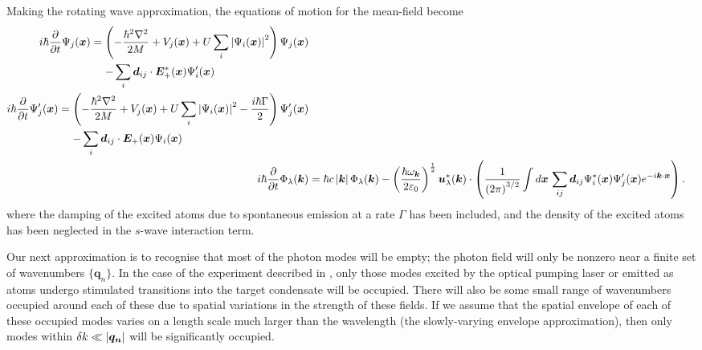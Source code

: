 Making the rotating wave approximation, the equations of motion for the mean-field become
\begin{subequations}
    \label{OpticalPumping:MeanFieldRWAEvolution}
    \begin{align}
        \begin{split}
            i \hbar \frac{\partial}{\partial t} \Psi_j(\bm{x}) &= \left( -\frac{\hbar^2 \nabla^2}{2M} + V_j(\bm{x}) + U \sum_i \abs{\Psi_i(\bm{x})}^2\right) \Psi_j(\bm{x})\\
            &\relphantom{=} - \sum_i \bm{d}_{ij} \cdot \bm{E}_+^*(\bm{x}) \Psi'_i(\bm{x})
        \end{split}\\
        \begin{split}
            i \hbar \frac{\partial}{\partial t} \Psi'_j(\bm{x}) &= \left( -\frac{\hbar^2 \nabla^2}{2M} + V_j(\bm{x}) + U \sum_i \abs{\Psi_i(\bm{x})}^2 - \frac{i\hbar \Gamma}{2}\right) \Psi'_j(\bm{x})\\
            &\relphantom{=} - \sum_i \bm{d}_{ij} \cdot \bm{E}_+(\bm{x}) \Psi_i(\bm{x}) 
        \end{split}\\
        i \hbar \frac{\partial}{\partial t} \Phi_\lambda(\bm{k}) &= \hbar c \abs{\bm{k}} \Phi_\lambda(\bm{k}) - \left(\frac{\hbar \omega_{\bm{k}}}{2 \varepsilon_0}\right)^{\frac{1}{2}} \bm{u}_\lambda^*(\bm{k}) \cdot \left( \frac{1}{\left(2\pi\right)^{3/2}} \int d \bm{x}\, \sum_{ij}\bm{d}_{ij} \Psi^*_i(\bm{x}) \Psi'_j(\bm{x}) e^{-i \bm{k} \cdot \bm{x}} \right). \label{OpticalPumping:MeanFieldPhotonRWAEvolution}
    \end{align}
\end{subequations}
where the damping of the excited atoms due to spontaneous emission at a rate $\Gamma$ has been included, and the density of the excited atoms has been neglected in the $s$-wave interaction term.

Our next approximation is to recognise that most of the photon modes will be empty; the photon field will only be nonzero near a finite set of wavenumbers $\{\bm{q}_n\}$.  In the case of the experiment described in , only those modes excited by the optical pumping laser or emitted as atoms undergo stimulated transitions into the target condensate will be occupied.  There will also be some small range of wavenumbers occupied around each of these due to spatial variations in the strength of these fields.  If we assume that the spatial envelope of each of these occupied modes varies on a length scale much larger than the wavelength (the slowly-varying envelope approximation), then only modes within $\delta k \ll \left|\bm{q_n}\right|$ will be significantly occupied.

